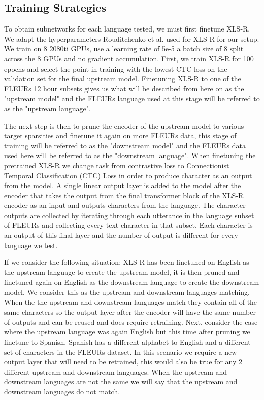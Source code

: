\subsection{Training Strategies}
To obtain subnetworks for each language tested, we must first finetune XLS-R. We adapt the hyperparameters Rouditchenko et al. \cite{FLEURS_XLSR_WHISPER} used for XLS-R for our setup. We train on 8 2080ti GPUs, use a learning rate of 5e-5 a batch size of 8 split across the 8 GPUs and no gradient accumulation. First, we train XLS-R for 100 epochs and select the point in training with the lowest CTC loss on the validation set for the final upstream model. Finetuning XLS-R to one of the FLEURs 12 hour subsets gives us what will be described from here on as the "upstream model" and the FLEURs language used at this stage will be referred to as the "upstream language". 

The next step is then to prune the encoder of the upstream model to various target sparsities and finetune it again on more FLEURs data, this stage of training will be referred to as the "downstream model" and the FLEURs data used here will be referred to as the "downstream language". When finetuning the pretrained XLS-R we change task from contrastive loss to Connectionist Temporal Classification (CTC) Loss in order to produce character as an output from the model. A single linear output layer is added to the model after the encoder that takes the output from the final transformer block of the XLS-R encoder as an input and outputs characters from the language. The character outputs are collected by iterating through each utterance in the language subset of FLEURs and collecting every text character in that subset. Each character is an output of this final layer and the number of output is different for every language we test.

\newpage
If we consider the following situation: XLS-R has been finetuned on English as the upstream language to create the upstream model, it is then pruned and finetuned again on English as the downstream language to create the downstream model. We consider this as the upstream and downstream languages matching. When the the upstream and downstream languages match they contain all of the same characters so the output layer after the encoder will have the same number of outputs and can be reused and does require retraining. Next, consider the case where the upstream language was again English but this time after pruning we finetune to Spanish. Spanish has a different alphabet to English and a different set of characters in the FLEURs dataset. In this scenario we require a new output layer that will need to be retrained, this would also be true for any 2 different upstream and downstream languages. When the upstream and downstream languages are not the same we will say that the upstream and downstream languages do not match. 

